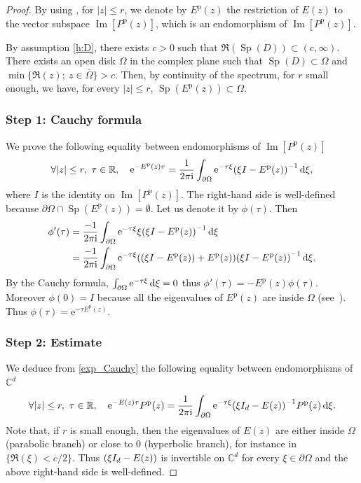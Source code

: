 \documentclass[JEP,XML,SOM,Unicode,NoEqCountersInSection]{cedram}
\theoremstyle{plain}
\theoremstyle{definition}
\theoremstyle{remark}
\DeclareMathOperator{\Sp}{Sp}
\DeclareMathOperator{\Ima}{Im}
\newcommand{\diff}[1][-3]{\ensuremath{\mathop{}\mkern#1mu\mathrm{d}}}
\newcommand{\set}{\mathbb}
\newcommand{\R}{} %
\renewcommand{\R}{\set{R}}
\renewcommand{\C}{\set{C}}
\newcommand{\p}{{\mathrm p}}
\newcommand{\eu}{\mathrm e}
\newcommand{\iu}{\mathrm i}
\let\originalleft\left
\let\originalright\right
\renewcommand{\left}{\mathopen{}\mathclose\bgroup\originalleft}
\renewcommand{\right}{\aftergroup\egroup\originalright}
\begin{document}
\begin{proof}
By using , for $|z| \leq r$, we denote by $E^\p(z)$ the restriction of $E(z)$ to the vector subspace $\Ima[P^\p(z)]$, which is an endomorphism of $\Ima[P^\p(z)]$.

By assumption \eqref{h:D}, there exists $c>0$ such that $\Re(\Sp(D)) \subset (c, \infty)$.
There exists an open disk $\Omega$ in the complex plane such that $\Sp(D) \subset \Omega$ and $\min\{ \Re(z);\ z\in \overline{\Omega} \} >c$. Then, by continuity of the spectrum, for $r$ small enough, we have, for every $|z|\leq r$, $\Sp(E^\p(z)) \subset \Omega$.

\subsubsection*{Step 1: Cauchy formula}
We prove the following equality between endomorphisms of $\Ima[P^\p(z)]$
\begin{equation} \label{exp_Cauchy}
\forall |z|\leq r,\ \tau \in \R, \quad
\eu^{ -E^\p (z)\tau}=\frac{1}{2\pi \iu } \int_{\partial\Omega} \eu^{-\tau \xi} \left(\xi I - E^\p(z) \right)^{-1} \diff\xi,
\end{equation}
where $I$ is the identity on $\Ima[P^\p(z)]$.
The right-hand side is well-defined because $\partial\Omega \cap\Sp(E^\p(z)) = \emptyset$. Let us denote it by $\phi(\tau)$.
Then
\begin{align*}
\phi'(\tau) & =\frac{-1}{2\pi \iu } \int_{\partial\Omega} \eu^{-\tau \xi} \xi \left(\xi I - E^\p(z) \right)^{-1} \diff\xi
\\ & = \frac{-1}{2\pi \iu } \int_{\partial\Omega} \eu^{-\tau \xi} \left((\xi I - E^\p(z))+E^\p(z) \right) \left(\xi I - E^\p(z) \right)^{-1} \diff\xi.
\end{align*}
By the Cauchy formula, $\int_{\partial\Omega} \eu^{-\tau \xi} \diff\xi=0$ thus
$\phi'(\tau)=-E^\p(z)\phi(\tau)$. Moreover $\phi(0)=I$ because all the eigenvalues of $E^\p(z)$ are inside $\Omega$ (see~\cite[Ch.\,I, Prob.\,5.9]{kato_1995}). Thus $\phi(\tau)=\eu^{-\tau E^\p(z)}$.

\subsubsection*{Step 2: Estimate}
We deduce from \eqref{exp_Cauchy} the following equality between endomorphisms of $\C^d$
\begin{equation} \label{exp_Cauchy_Pp}
\forall |z|\leq r,\ \tau \in \R, \quad
\eu^{ - E (z)\tau} P^\p(z) =\frac{1}{2\pi \iu } \int_{\partial\Omega} \eu^{-\tau \xi} \left(\xi I_d - E(z) \right)^{-1} P^\p(z) \diff\xi.
\end{equation}
Note that, if $r$ is small enough, then the eigenvalues of $E(z)$ are either inside $\Omega$ (parabolic branch) or close to $0$ (hyperbolic branch), for instance in $\{ \Re(\xi) < c/2 \}$. Thus $\left(\xi I_d - E(z) \right)$ is invertible on $\C^d$ for every $\xi \in \partial\Omega$ and the above right-hand side is well-defined.


\end{proof}
\end{document}
